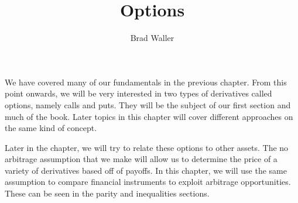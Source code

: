 \documentclass{ximera}
\title{Options}
\author{Brad Waller}
\begin{document}
\begin{abstract}
\end{abstract}
\maketitle

We have covered many of our fundamentals in the previous chapter. From this point onwards, we will be very interested in two types of derivatives called options, namely calls and puts. They will be the subject of our first section and much of the book. Later topics in this chapter will cover different approaches on the same kind of concept.

Later in the chapter, we will try to relate these options to other assets. The no arbitrage assumption that we make will allow us to determine the price of a variety of derivatives based off of payoffs. In this chapter, we will use the same assumption to compare financial instruments to exploit arbitrage opportunities. These can be seen in the parity and inequalities sections. 
\end{document}
